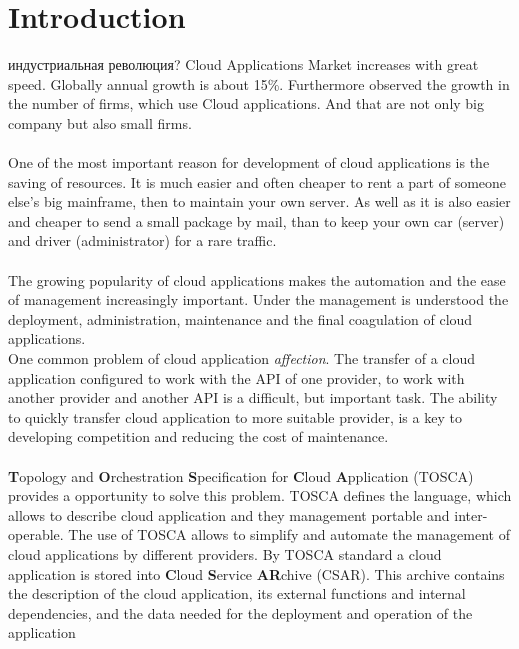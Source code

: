 
\chapter{Introduction}
индустриальная революция?
\fi
Cloud Applications Market increases with great speed. Globally annual growth is about 15\%. \cite*{statista_global}
Furthermore observed the growth in the number of firms, which use Cloud applications. And that are not only big company but also small firms. \cite*{destatis_2014, destatis_2016} \\ \\
One of the most important reason for development of cloud applications is the saving of resources.
It is much easier and often cheaper to rent a part of someone else's big mainframe, then to maintain your own server.
As well as it is also easier and cheaper to send a small package by mail, than to keep your own car (server) and driver (administrator) for a rare traffic.\\ \\
The growing popularity of cloud applications makes the automation and the ease of management increasingly important.
Under the management is understood the deployment, administration, maintenance and the final coagulation of cloud applications.\\
One common problem of cloud application \emph{affection}. The transfer of a cloud application configured to work with the API of one provider, to work with another provider and another API is a difficult, but important task. The ability to quickly transfer cloud application to more suitable provider, is a key to developing competition and reducing the cost of maintenance.\\ \\
\textbf{T}opology and \textbf{O}rchestration \textbf{S}pecification for \textbf{C}loud \textbf{A}pplication (TOSCA) \cite*{TOSCA-v1.0} provides a opportunity to solve this problem. TOSCA defines the language, which allows to describe cloud application and they management portable and inter-operable. 
The use of TOSCA allows to simplify and automate the management of cloud applications by different providers. By TOSCA standard a cloud application is stored into \textbf{C}loud \textbf{S}ervice \textbf{AR}chive (CSAR).
This archive contains the description of the cloud application, its external functions and internal dependencies, and the data needed for the deployment and operation of the application\\\\
